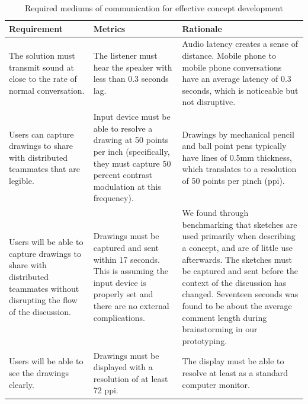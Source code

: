 \begin{table}[!h]
        \centering
                \begin{tabular}{| p{42mm} | p{42mm} | p{51mm} |}
                \hline
                \textbf{Requirement}    & \textbf{Metrics} & \textbf{Rationale} \\
                \hline
The solution must transmit sound at close to the rate of normal conversation. & The listener must hear the speaker with less than 0.3 seconds lag.      & Audio latency creates a sense of distance. Mobile phone to mobile phone conversations have an average latency of 0.3 seconds, which is noticeable but not disruptive. \\ \hline
Users can capture drawings to share with distributed teammates that are legible. &      Input device must be able to resolve a drawing at 50 points per inch (specifically, they must capture 50 percent contrast modulation at this frequency). &      Drawings by mechanical pencil and ball point pens typically have lines of 0.5mm thickness, which translates to a resolution of 50 points per pinch (ppi).\\ \hline
Users will be able to capture drawings to share with distributed teammates without disrupting the flow of the discussion. & Drawings must be captured and sent within 17 seconds. This is assuming the input device is properly set and there are no external complications. &  We found through benchmarking that sketches are used primarily when describing a concept, and are of little use afterwards. The sketches must be captured and sent before the context of the discussion has changed. Seventeen seconds was found to be about the average comment length during brainstorming in our prototyping. \\ \hline
Users will be able to see the drawings clearly. &       Drawings must be displayed with a resolution of at least 72 ppi.&       The display must be able to resolve at least as a standard computer monitor.\\ 
\hline
                \end{tabular}
        \caption{Required mediums of communication for effective concept development}
        \label{tab:mediums2}
\end{table}

